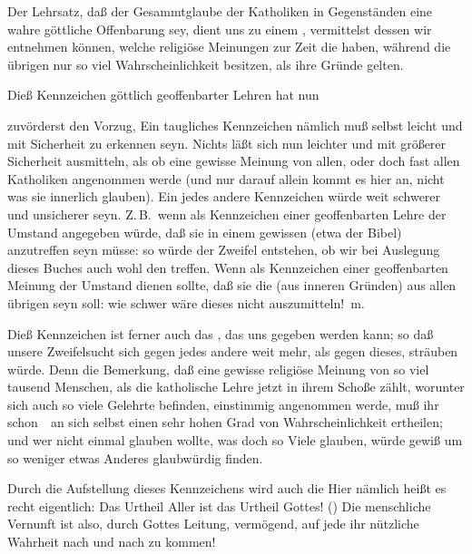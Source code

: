Der Lehrsatz, daß der Gesammtglaube der Katholiken in  Gegenständen eine wahre göttliche Offenbarung sey, dient uns zu einem , vermittelst dessen wir entnehmen können, welche religiöse Meinungen zur Zeit die  haben, während die übrigen nur so viel Wahrscheinlichkeit besitzen, als ihre Gründe gelten.\par
Dieß Kennzeichen göttlich geoffenbarter Lehren hat nun 
\begin{aufza}
\item zuvörderst den Vorzug,  Ein taugliches Kennzeichen nämlich muß selbst leicht und mit Sicherheit zu erkennen seyn. Nichts läßt sich nun leichter und mit größerer Sicherheit ausmitteln, als ob eine gewisse Meinung von allen, oder doch fast allen Katholiken  angenommen werde (und nur darauf allein kommt es hier an, nicht was sie innerlich glauben). Ein jedes andere Kennzeichen würde weit schwerer und unsicherer seyn. Z.\,B.\ wenn als Kennzeichen einer geoffenbarten Lehre der Umstand angegeben würde, daß sie in einem gewissen  (etwa der Bibel) anzutreffen seyn müsse: so würde der Zweifel entstehen, ob wir bei Auslegung dieses Buches auch wohl den  treffen. Wenn als Kennzeichen einer geoffenbarten Meinung der Umstand dienen sollte, daß sie die  (aus inneren Gründen)  aus allen übrigen seyn soll: wie schwer wäre dieses nicht auszumitteln! \udgl\,m.
\item Dieß Kennzeichen ist ferner auch das , das uns gegeben werden kann; so daß unsere Zweifelsucht sich gegen jedes andere weit mehr, als gegen dieses, sträuben würde. Denn die Bemerkung, daß eine gewisse religiöse Meinung von so viel tausend Menschen, als die katholische Lehre jetzt in ihrem Schoße zählt, worunter sich auch so viele Gelehrte befinden, einstimmig angenommen werde, muß ihr schon~\ an sich selbst einen sehr hohen Grad von Wahrscheinlichkeit ertheilen; und wer nicht einmal glauben wollte, was doch so Viele glauben, würde gewiß um so weniger etwas Anderes glaubwürdig finden.
\item Durch die Aufstellung dieses Kennzeichens wird auch die  Hier nämlich heißt es recht eigentlich: Das Urtheil Aller ist das Urtheil Gottes! () Die menschliche Vernunft ist also, durch Gottes Leitung, vermögend, auf jede ihr nützliche Wahrheit nach und nach zu kommen! \usw\

\end{aufza}
